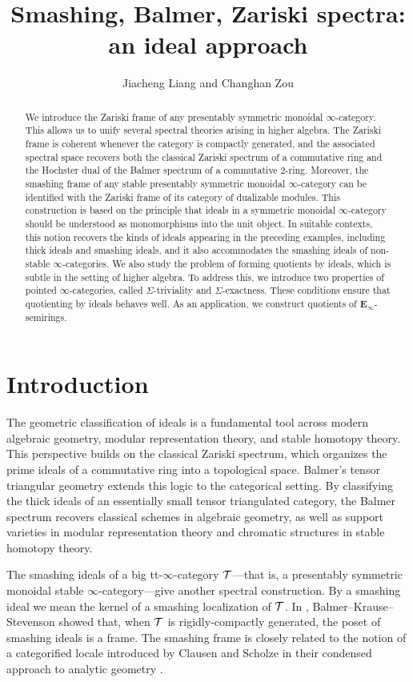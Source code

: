 \documentclass[10pt,a4paper,oneside]{article}
\title{Smashing, Balmer, Zariski spectra: an ideal approach}
\author{Jiacheng Liang and Changhan Zou}   %
\date{}
\begin{document}
\let\mathbb=\mathbf
\maketitle
\begin{abstract}
We introduce the Zariski frame of any presentably symmetric monoidal $\infty$-category. This allows us to unify several spectral theories arising in higher algebra. The Zariski frame is coherent whenever the category is compactly generated, and the associated spectral space recovers both the classical Zariski spectrum of a commutative ring and the Hochster dual of the Balmer spectrum of a commutative $2$-ring. Moreover, the smashing frame of any stable presentably symmetric monoidal $\infty$-category can be identified with the Zariski frame of its category of dualizable modules. This construction is based on the principle that ideals in a symmetric monoidal $\infty$-category should be understood as monomorphisms into the unit object. In suitable contexts, this notion recovers the kinds of ideals appearing in the preceding examples, including thick ideals and smashing ideals, and it also accommodates the smashing ideals of non-stable $\infty$-categories. We also study the problem of forming quotients by ideals, which is subtle in the setting of higher algebra. To address this, we introduce two properties of pointed $\infty$-categories, called $\Sigma$-triviality and $\Sigma$-exactness. These conditions ensure that quotienting by ideals behaves well. As an application, we construct quotients of $\mathbb{E}_\infty$-semirings.
\end{abstract}

\tableofcontents
\section{Introduction}
The geometric classification of ideals is a fundamental tool across modern algebraic geometry, modular representation theory, and stable homotopy theory. This perspective builds on the classical Zariski spectrum, which organizes the prime ideals of a commutative ring into a topological space. Balmer’s tensor triangular geometry \cite{Balmer05a} extends this logic to the categorical setting. By classifying the thick ideals of an essentially small tensor triangulated category, the Balmer spectrum recovers classical schemes in algebraic geometry, as well as support varieties in modular representation theory and chromatic structures in stable homotopy theory.

The smashing ideals of a big tt-$\infty$-category $\mathcal{T}$---that is, a presentably symmetric monoidal stable $\infty$-category---give another spectral construction. By a smashing ideal we mean the kernel of a smashing localization of $\mathcal{T}$. In \cite{BalmerKrauseStevenson20}, Balmer--Krause--Stevenson showed that, when $\mathcal{T}$ is rigidly-compactly generated, the poset of smashing ideals is a frame. The smashing frame is closely related to the notion of a categorified locale introduced by Clausen and Scholze in their condensed approach to analytic geometry \cite{clausen2026condensed}.
\end{document}
